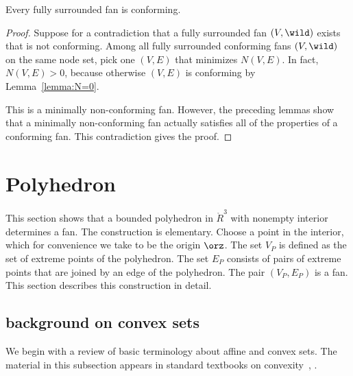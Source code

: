 \begin{lemma}[conformance]\label{lemma:face}
Every fully surrounded fan is conforming.
\end{lemma}

\begin{proof}
Suppose for a contradiction that a fully surrounded fan $(V,\wild )$
exists that is not conforming.  Among all fully surrounded
conforming fans $(V,\wild )$ on the same node set, pick one $(V,E)$
that minimizes $N(V,E)$.  In fact, $N(V,E)>0$, because otherwise $(V,E)$
is conforming by Lemma~\ref{lemma:N=0}.

This is a minimally non-conforming fan.  However, the preceding lemmas show
that a minimally non-conforming fan actually satisfies all of the properties
of a conforming fan.   This contradiction gives the proof.
\end{proof}



\section{Polyhedron}\label{sec:poly}

This section shows that a bounded polyhedron in $\ring{R}^3$ with
nonempty interior determines a fan.  The construction is elementary.
Choose a point in the interior, which for convenience we take to be
the origin $\orz$.  The set $V_P$ is defined as the set of extreme
points of the polyhedron.  The set $E_P$ consists of pairs of extreme
points that are joined by an edge of the polyhedron.  The pair
$(V_P,E_P)$ is a fan.  This section describes this construction in
 detail.



\subsection{background on convex sets}

We begin with a review of basic terminology about affine and convex
sets.  The material in this subsection appears in standard textbooks
on convexity~\cite{barvinok:2002}, \cite{webster:1994}.

